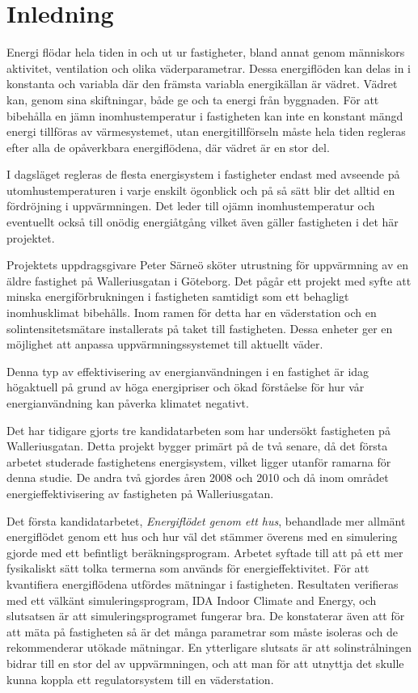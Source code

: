 \chapter{Inledning}

Energi flödar hela tiden in och ut ur fastigheter, bland annat genom människors aktivitet, ventilation och olika väderparametrar. Dessa energiflöden kan delas in i konstanta och variabla där den främsta variabla energikällan är vädret. Vädret kan, genom sina skiftningar, både ge och ta energi från byggnaden. För att bibehålla en jämn inomhustemperatur i fastigheten kan inte en konstant mängd energi tillföras av värmesystemet, utan energitillförseln måste hela tiden regleras efter alla de opåverkbara energiflödena, där vädret är en stor del.

I dagsläget regleras de flesta energisystem i fastigheter endast med avseende på utomhustemperaturen i varje enskilt ögonblick och på så sätt blir det alltid en fördröjning i uppvärmningen. Det leder till ojämn inomhustemperatur och eventuellt också till onödig energiåtgång vilket även gäller fastigheten i det här projektet.

Projektets uppdragsgivare Peter Särneö sköter utrustning för uppvärmning av en äldre fastighet på Walleriusgatan i Göteborg. Det pågår ett projekt med syfte att minska energiförbrukningen i fastigheten samtidigt som ett behagligt inomhusklimat bibehålls. Inom ramen för detta har en väderstation och en solintensitetsmätare installerats på taket till fastigheten. Dessa enheter ger en möjlighet att anpassa uppvärmningssystemet till aktuellt  väder. %

Denna typ av effektivisering av energianvändningen i en fastighet är idag högaktuell på grund av höga energipriser och ökad förståelse för hur vår energianvändning kan påverka klimatet negativt.

Det har tidigare gjorts tre kandidatarbeten som har undersökt fastigheten på Walleriusgatan. Detta projekt bygger primärt på de två senare, då det första arbetet studerade fastighetens energisystem, vilket ligger utanför ramarna för denna studie. De andra två gjordes åren 2008 och 2010 och då inom området energieffektivisering av fastigheten på Walleriusgatan. 

Det första kandidatarbetet, \textit{Energiflödet genom ett hus}\cite{kandidatarbete2008},
behandlade mer allmänt energiflödet genom ett hus och hur väl det stämmer
överens med en simulering gjorde med ett befintligt beräkningsprogram. Arbetet syftade
till att på ett mer fysikaliskt sätt tolka termerna som används för
energieffektivitet. För att kvantifiera energiflödena utfördes mätningar i
fastigheten. Resultaten verifieras med ett välkänt simuleringsprogram,
IDA Indoor Climate and Energy, och slutsatsen är att simuleringsprogramet fungerar bra.
De konstaterar även att för att mäta på fastigheten så är det många parametrar som
måste isoleras och de rekommenderar utökade mätningar.
 En ytterligare slutsats är att solinstrålningen bidrar till en stor del av
uppvärmningen, och att man för att utnyttja det skulle kunna koppla ett
regulatorsystem till en väderstation.

